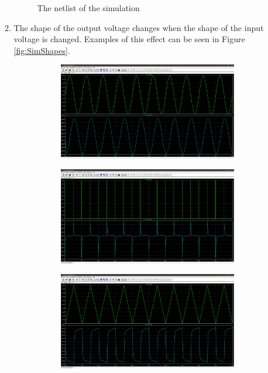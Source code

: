\documentclass[12pt]{article}
\begin{document}
\begin{enumerate}
\begin{enumerate}
\begin{figure}[h!]
            \caption{The netlist of the simulation}
            \label{fig:Netlist}
        \end{figure} \newpage
        \item The shape of the output voltage changes when the shape of the input voltage is changed. Examples of this effect can be seen in Figure \ref{fig:SimShapes}. \\
        \begin{figure}[h!]
            \centering
            \begin{subfigure}[b]{0.31\textwidth}
                \includegraphics[width=\textwidth]{SchematicSine.png}
            \end{subfigure}
            \!
            \begin{subfigure}[b]{0.31\textwidth}
                \includegraphics[width=\textwidth]{SchematicSquare.png}
            \end{subfigure}
            \!
            \begin{subfigure}[b]{0.31\textwidth}
                \includegraphics[width=\textwidth]{SchematicTriangle.png}

\end{subfigure}
\end{figure}
\end{enumerate}
\end{enumerate}
\end{document}
